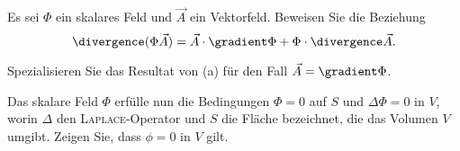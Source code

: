\begin{atiTask}[
  title = Spezielle Vektorfelder
]

\begin{atiSubtasks}
\item Es sei $\Phi$ ein skalares Feld und $\vec{A}$ ein Vektorfeld. Beweisen Sie die Beziehung
\[
\divergence (\Phi \vec{A})=\vec{A}\cdot\gradient \Phi+\Phi\cdot \divergence \vec{A}.
\]
\item Spezialisieren Sie das Resultat von (a) für den Fall $\vec{A}=\gradient \Phi$.
\item Das skalare Feld $\Phi$ erfülle nun die Bedingungen $\Phi=0$ auf $S$ und $\Delta \Phi=0$ in $V$, worin $\Delta$ den \textsc{Laplace}-Operator und $S$ die Fläche bezeichnet, die das Volumen $V$ umgibt. Zeigen Sie, dass $\phi=0$ in $V$ gilt.
\end{atiSubtasks}


\end{atiTask}

\begin{atiSolution}
	
\end{atiSolution}
